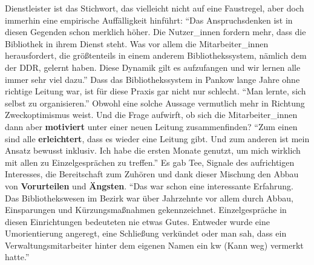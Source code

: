 \documentclass[a4paper,
fontsize=11pt,
oneside,
numbers=noperiodatend,
parskip=half-,
bibliography=totoc,
final
]{scrartcl}
\begin{document}
Dienstleister ist das Stichwort, das vielleicht nicht auf eine
Faustregel, aber doch immerhin eine empirische Auffälligkeit hinführt:
\enquote{Das Anspruchsdenken ist in diesen Gegenden schon merklich
höher. Die Nutzer\_innen fordern mehr, dass die Bibliothek in ihrem
Dienst steht. Was vor allem die Mitarbeiter\_innen herausfordert, die
größtenteils in einem anderem Bibliothekssystem, nämlich dem der DDR,
gelernt haben. Diese Dynamik gilt es aufzufangen und wir lernen alle
immer sehr viel dazu.} Dass das Bibliothekssystem in Pankow lange Jahre
ohne richtige Leitung war, ist für diese Praxis gar nicht nur schlecht.
\enquote{Man lernte, sich selbst zu organisieren.} Obwohl eine solche
Aussage vermutlich mehr in Richtung Zweckoptimismus weist. Und die Frage
aufwirft, ob sich die Mitarbeiter\_innen dann aber \textbf{motiviert}
unter einer neuen Leitung zusammenfinden? \enquote{Zum einen sind alle
\textbf{erleichtert}, dass es wieder eine Leitung gibt. Und zum anderen
ist mein Ansatz bewusst inklusiv. Ich habe die ersten Monate genutzt, um
mich wirklich mit allen zu Einzelgesprächen zu treffen.} Es gab Tee,
Signale des aufrichtigen Interesses, die Bereitschaft zum Zuhören und
dank dieser Mischung den Abbau von \textbf{Vorurteilen} und
\textbf{Ängsten}. \enquote{Das war schon eine interessante Erfahrung.
Das Bibliothekswesen im Bezirk war über Jahrzehnte vor allem durch
Abbau, Einsparungen und Kürzungsmaßnahmen gekennzeichnet.
Einzelgespräche in diesen Einrichtungen bedeuteten nie etwas Gutes.
Entweder wurde eine Umorientierung angeregt, eine Schließung verkündet
oder man sah, dass ein Verwaltungsmitarbeiter hinter dem eigenen Namen
ein kw (Kann weg) vermerkt hatte.}
\end{document}
